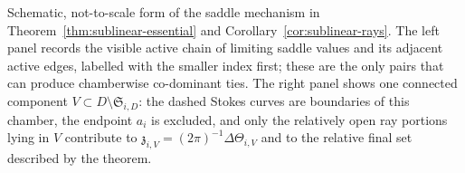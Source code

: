 \documentclass[reqno]{article}
\theoremstyle{definition}
\theoremstyle{remark}
\theoremstyle{plain}
\begin{document}
\begin{center}
\begin{minipage}{\linewidth}
\captionsetup{type=figure,hypcap=false}
\caption{Schematic, not-to-scale form of the saddle mechanism in Theorem~\ref{thm:sublinear-essential} and Corollary~\ref{cor:sublinear-rays}. The left panel records the visible active chain of limiting saddle values and its adjacent active edges, labelled with the smaller index first; these are the only pairs that can produce chamberwise co-dominant ties. The right panel shows one connected component $V\subset D\setminus\mathfrak S_{i,D}$: the dashed Stokes curves are boundaries of this chamber, the endpoint $a_i$ is excluded, and only the relatively open ray portions lying in $V$ contribute to $\mathfrak z_{i,V}=(2\pi)^{-1}\Delta\Theta_{i,V}$ and to the relative final set described by the theorem.}
\label{fig:active-saddle-rays}
\end{minipage}
\end{center}
\end{document}
